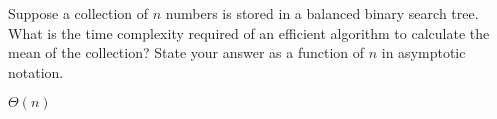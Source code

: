 \begin{prob}
    Suppose a collection of $n$ numbers is stored in a balanced binary
    search tree. What is the time complexity required of an efficient algorithm
    to calculate the mean of the collection? State your answer as a function of
    $n$ in asymptotic notation.

    \begin{soln}
        $\Theta(n)$
    \end{soln}

\end{prob}

